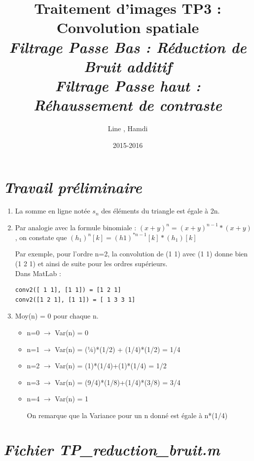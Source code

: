 \documentclass{article}
\title{\textbf{Traitement d'images TP3 : Convolution spatiale}\\ \it{Filtrage Passe Bas : Réduction de Bruit additif} \\ \it{Filtrage Passe haut : Réhaussement de contraste}}
\author{Line \bsc{POUVARET}, Hamdi \bsc{BENAOUN}}
\date{2015-2016}
\begin{document}
\maketitle

\section*{\it{\textbf{Travail préliminaire}}}

\begin{enumerate}[label=\arabic*$\degres$)]
	\item La somme en ligne notée $s_{n}$ des éléments du triangle est égale à 2n.
	\item Par analogie avec la formule binomiale : $(x+y)^{n}=(x+y)^{n-1}*(x+y)$, on constate que $(h_{1})^{n}[k] = (h1)^{*n-1}[k]*(h_{1})[k]$

Par exemple, pour l’ordre n=2, la convolution de (1 1) avec (1 1) donne bien (1 2 1) et ainsi de suite pour les ordres supérieurs.\\

Dans MatLab : 
\begin{lstlisting}
conv2([ 1 1], [1 1]) = [1 2 1]
conv2([1 2 1], [1 1]) = [ 1 3 3 1] 
\end{lstlisting}
	\item 
Moy(n) = 0 pour chaque n.
	\begin{itemize}\renewcommand{\labelitemi}{$\bullet$}
		\item n=0 $\rightarrow$ Var(n) = 0
		\item n=1 $\rightarrow$ Var(n) = (¼)*(1/2) + (1/4)*(1/2) = 1/4
		\item n=2 $\rightarrow$ Var(n) = (1)*(1/4)+(1)*(1/4) = 1/2
		\item n=3 $\rightarrow$ Var(n) = (9/4)*(1/8)+(1/4)*(3/8) = 3/4
		\item n=4 $\rightarrow$ Var(n) = 1
		
On remarque que la Variance pour un n donné est égale à n*(1/4)
	\end{itemize}
	
\end{enumerate}

\section*{\it{\textbf{Fichier TP\_reduction\_bruit.m}}}
\end{document}

